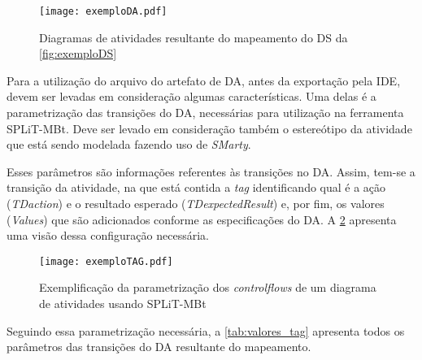 \begin{figure}[H]
	\centering
	\texttt{[image: exemploDA.pdf]}
	\caption{Diagramas de atividades resultante do mapeamento do DS da \ref{fig:exemploDS}}
	\label{fig:exemploDA}
\end{figure}

Para a utilização do arquivo do artefato de DA, antes da exportação pela IDE, devem ser levadas em consideração algumas características. Uma delas é a parametrização das transições do DA, necessárias para utilização na ferramenta SPLiT-MBt. Deve ser levado em consideração também o estereótipo da atividade que está sendo modelada fazendo uso de \textit{SMarty}.

Esses parâmetros são informações referentes às transições no DA. Assim, tem-se a transição da atividade, na que está contida a \textit{tag} identificando qual é a ação (\textit{TDaction}) e o resultado esperado (\textit{TDexpectedResult}) e, por fim, os valores (\textit{Values}) que são adicionados conforme as especificações do DA. A \ref{fig:exemploTAG} apresenta uma visão dessa configuração necessária. 

\begin{figure}[H]
	\texttt{[image: exemploTAG.pdf]}
	\caption{Exemplificação da parametrização dos \textit{controlflows} de um diagrama de atividades usando SPLiT-MBt \cite{costa2016split}}
	\label{fig:exemploTAG}
\end{figure}

Seguindo essa parametrização necessária, a \ref{tab:valores_tag} apresenta todos os parâmetros das transições do DA resultante do mapeamento.


